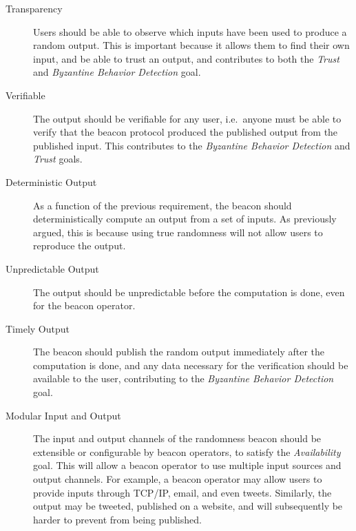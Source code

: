 \begin{description}
    \item [Transparency] 
Users should be able to observe which inputs have been used to produce a random output. This is important because it allows them to find their own input, and be able to trust an output, and contributes to both the \emph{Trust} and \emph{Byzantine Behavior Detection} goal. 

    \item[Verifiable]
The output should be verifiable for any user, i.e.\ anyone must be able to verify that the beacon protocol produced the published output from the published input. This contributes to the \emph{Byzantine Behavior Detection} and \emph{Trust} goals. 

    \item[Deterministic Output]
As a function of the previous requirement, the beacon should deterministically compute an output from a set of inputs.
As previously argued, this is because using true randomness will not allow users to reproduce the output.

    \item[Unpredictable Output]
The output should be unpredictable before the computation is done, even for the beacon operator. 

    \item[Timely Output]
The beacon should publish the random output immediately after the computation is done, and any data necessary for the verification should be available to the user, contributing to the \emph{Byzantine Behavior Detection} goal. 

    \item[Modular Input and Output]
The input and output channels of the randomness beacon should be extensible or configurable by beacon operators, to satisfy the \emph{Availability} goal.
This will allow a beacon operator to use multiple input sources and output channels.
For example, a beacon operator may allow users to provide inputs through TCP/IP, email, and even tweets.
Similarly, the output may be tweeted, published on a website, and will subsequently be harder to prevent from being published. 

    



\end{description}
